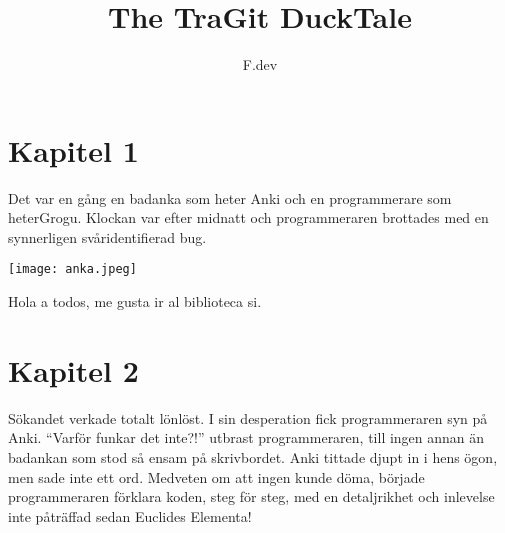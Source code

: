 \documentclass[a4paper]{article}
\begin{document}
\title{The TraGit DuckTale}
\author{F.dev}
\maketitle

\section*{Kapitel 1}
Det var en gång en badanka som heter Anki och en programmerare som heterGrogu.
Klockan var efter midnatt och programmeraren brottades med en synnerligen svåridentifierad bug.

\begin{center}
	\texttt{[image: anka.jpeg]}
\end{center}

Hola a todos, me gusta ir al biblioteca si. 

\section*{Kapitel 2}
Sökandet verkade totalt lönlöst. I sin desperation fick programmeraren syn på Anki.
``Varför funkar det inte?!'' utbrast programmeraren, till ingen annan än badankan som stod så ensam på skrivbordet.
Anki tittade djupt in i hens ögon, men sade inte ett ord. Medveten om att ingen kunde döma, började programmeraren förklara koden, steg för steg, med en detaljrikhet och inlevelse inte påträffad sedan Euclides Elementa!

\end{document}

